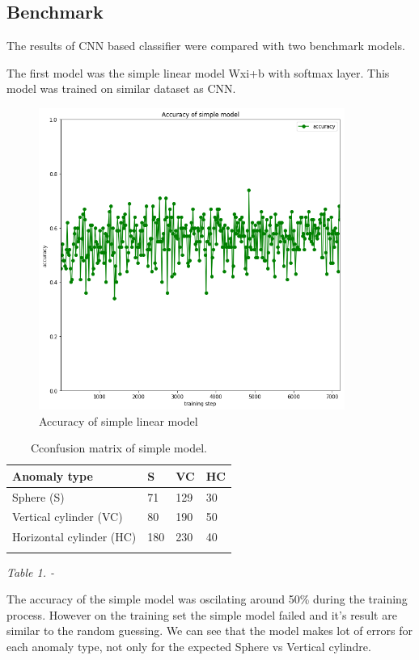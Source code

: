 \documentclass{article}
\begin{document}
\subsection{Benchmark}\label{benchmark}

The results of CNN based classifier were compared with two benchmark
models.

The first model was the simple linear model Wxi+b with softmax layer.
This model was trained on similar dataset as CNN.



\begin{figure}[!htp]
\centerline{\includegraphics[width=10cm]{img/simple_model_accuracy.png}}
\renewcommand{\figurename}{Figure}
\caption[Accuracy of simple linear model]{Accuracy of simple linear model}
\label{fig:SimpleModelAccuracy}
\end{figure}


\begin{longtable}[c]{@{}llll@{}}
\toprule
Anomaly type & S & VC & HC\tabularnewline
\midrule
\endhead
Sphere (S) & 71 & 129 & 30\tabularnewline
Vertical cylinder (VC) & 80 & 190 & 50\tabularnewline
Horizontal cylinder (HC) & 180 & 230 & 40\tabularnewline
\bottomrule
\caption[Confusion matrix of simple model]{Cconfusion matrix of simple model.}
\label{tab:ConfusionMatrixSimpleModel}
\end{longtable}

\emph{Table 1. - }

The accuracy of the simple model was oscilating around 50\% during the
training process. However on the training set the simple model failed
and it's result are similar to the random guessing. We can see that the
model makes lot of errors for each anomaly type, not only for the
expected Sphere vs Vertical cylindre.
\end{document}
